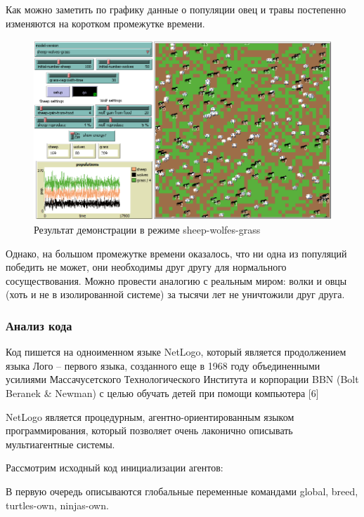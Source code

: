 \documentclass[14pt,a4paper,report]{report}
\begin{document}
Как можно заметить по графику данные о популяции овец и травы постепенно изменяются на коротком промежутке времени.

\clearpage

\begin{figure}[h!]
	\centering
	\includegraphics[scale = 0.63]{images/7.png}
	\caption{Результат демонстрации в режиме sheep-wolfes-grass}
\end{figure}

Однако, на большом промежутке времени оказалось, что ни одна из популяций победить не может, они необходимы друг другу для нормального сосуществования. Можно провести аналогию с реальным миром: волки и овцы (хоть и не в изолированной системе) за тысячи лет не уничтожили друг друга.

\subsubsection{Анализ кода}

Код пишется на одноименном языке NetLogo, который является продолжением языка Лого -- первого языка, созданного еще в 1968 году объединенными усилиями Массачусетского Технологического Института и корпорации BBN (Bolt Beranek \& Newman) с целью обучать детей при помощи компьютера [6]

NetLogo является процедурным, агентно-ориентированным языком программирования, который позволяет очень лаконично описывать мультиагентные системы.

Рассмотрим исходный код инициализации агентов:



В первую очередь описываются глобальные переменные командами global, breed, turtles-own, ninjas-own. 
\end{document}
